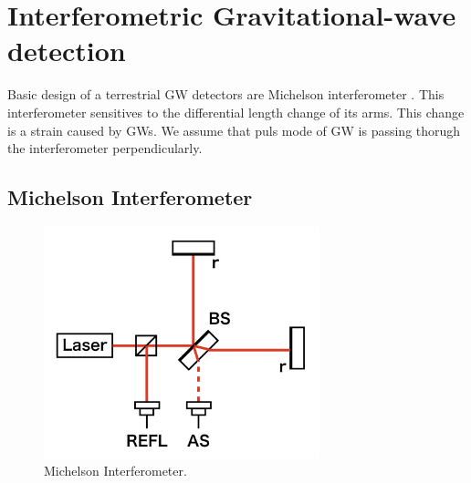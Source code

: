 



\section{Interferometric Gravitational-wave detection} \label{sec:12}
Basic design of a terrestrial GW detectors are Michelson interferometer \cite{weiss1972electronically}. This interferometer sensitives to the differential length change of its arms. This change is a strain caused by GWs. We assume that puls mode of GW is passing thorugh the interferometer perpendicularly.

\subsection{Michelson Interferometer} \label{sec:121}
\begin{figure}[h]
  \begin{center}   
    \includegraphics[width=8.0cm]{./img_chap1/img132.png}
    \caption{Michelson Interferometer. }\label{img:img132}
  \end{center}
\end{figure}

